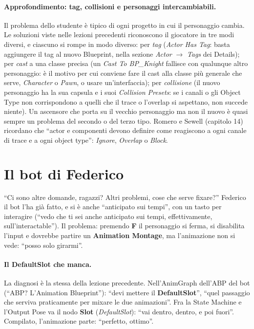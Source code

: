 \paragraph{Approfondimento: tag, collisioni e personaggi intercambiabili.} Il problema
dello studente è tipico di ogni progetto in cui il personaggio cambia. Le soluzioni
viste nelle lezioni precedenti riconoscono il giocatore in tre modi diversi, e ciascuno
si rompe in modo diverso: per \emph{tag} (\emph{Actor Has Tag}: basta aggiungere il tag
al nuovo Blueprint, nella sezione \emph{Actor} $\rightarrow$ \emph{Tags} dei Details);
per \emph{cast} a una classe precisa (un \emph{Cast To BP\_Knight} fallisce con qualunque
altro personaggio: è il motivo per cui conviene fare il cast alla classe più generale che
serve, \emph{Character} o \emph{Pawn}, o usare un'interfaccia); per \emph{collisione}
(il nuovo personaggio ha la sua capsula e i suoi \emph{Collision Presets}: se i canali o
gli Object Type non corrispondono a quelli che il trace o l'overlap si aspettano, non
succede niente). Un ascensore che porta su il vecchio personaggio ma non il nuovo è quasi
sempre un problema del secondo o del terzo tipo. Romero e Sewell (capitolo 14) ricordano
che ``actor e componenti devono definire come reagiscono a ogni canale di trace e a ogni
object type'': \emph{Ignore}, \emph{Overlap} o \emph{Block}.

\section{Il bot di Federico}
\label{ue10:sec:federico}

``Ci sono altre domande, ragazzi? Altri problemi, cose che serve fixare?'' Federico il
bot l'ha già fatto, e si è anche ``anticipato sui tempi'', con un tasto per interagire
(``vedo che ti sei anche anticipato sui tempi, effettivamente, sull'interactable''). Il
problema: premendo \textbf{F} il personaggio si ferma, si disabilita l'input e dovrebbe
partire un \textbf{Animation Montage}, ma l'animazione non si vede: ``posso solo girarmi''.

\paragraph{Il DefaultSlot che manca.} La diagnosi è la stessa della lezione precedente.
Nell'AnimGraph dell'ABP del bot (``ABP? L'Animation Blueprint''): ``devi mettere il
\textbf{DefaultSlot}'', ``quel passaggio che serviva praticamente per mixare le due
animazioni''. Fra la State Machine e l'Output Pose va il nodo \textbf{Slot}
(\emph{DefaultSlot}): ``vai dentro, dentro, e poi fuori''. Compilato, l'animazione
parte: ``perfetto, ottimo''.

